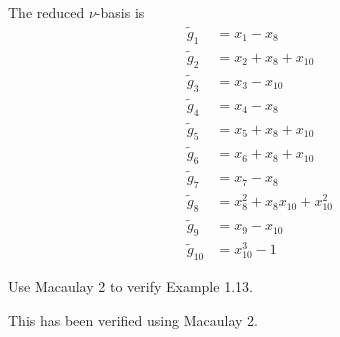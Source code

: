 \documentclass[10pt,letterpaper]{hmcpset}
\newcommand{\aln}[1]{\begin{align*} #1 \end{align*}} %
\begin{document}
\begin{solution}
The reduced $\nu$-basis is
\aln{
	\tilde{g}_1 &= x_1 - x_8\\
	\tilde{g}_2 &= x_2 + x_8 + x_{10}\\
	\tilde{g}_3 &= x_3 - x_{10}\\
	\tilde{g}_4 &= x_4 - x_8\\
	\tilde{g}_5 &= x_5 + x_8 + x_{10}\\
	\tilde{g}_6 &= x_6 + x_8 + x_{10}\\
	\tilde{g}_7 &= x_7 - x_8\\
	\tilde{g}_8 &= x_8^2 + x_8 x_{10} + x_{10}^2\\
	\tilde{g}_9 &= x_9 - x_{10}\\
	\tilde{g}_{10} &= x_{10}^3 - 1
}
\end{solution}


\begin{problem}[4]
Use Macaulay 2 to verify Example 1.13.
\end{problem}

\begin{solution}
This has been verified using Macaulay 2.
\end{solution}
\end{document}
